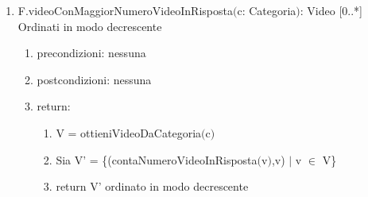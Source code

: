 \documentclass{article}
\begin{document}
\begin{enumerate}
\begin{enumerate}
        \newpage
        \item F.videoConMaggiorNumeroVideoInRisposta$($c: Categoria$)$: Video [0..*] Ordinati in modo decrescente
        \begin{enumerate}
            \item precondizioni: nessuna
            \item postcondizioni: nessuna
            \item return:
            \begin{enumerate}
                \item V = ottieniVideoDaCategoria$($c$)$
                \item Sia V' = \{(contaNumeroVideoInRisposta$($v$)$,v) $|$ v $\in$ V\}
                \item return V' ordinato in modo decrescente
            \end{enumerate}
        \end{enumerate}
        

\end{enumerate}
\end{enumerate}
\end{document}
